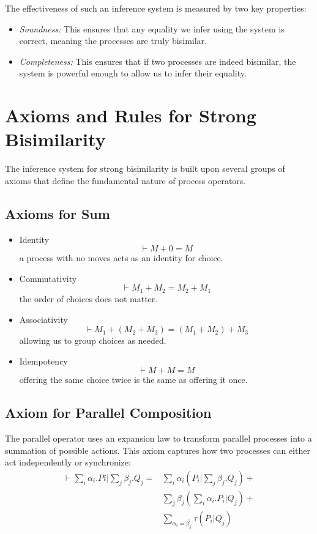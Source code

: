 The effectiveness of such an inference system is measured by two key properties:
\begin{itemize}
    \item \textit{Soundness:} This ensures that any equality we infer using the system is correct, meaning the processes are truly bisimilar.  
    \item \textit{Completeness:} This ensures that if two processes are indeed bisimilar, the system is powerful enough to allow us to infer their equality.
\end{itemize}

\section{Axioms and Rules for Strong Bisimilarity}
The inference system for strong bisimilarity is built upon several groups of axioms that define the fundamental nature of process operators.  

\subsection{Axioms for Sum}
\begin{itemize}
    \item Identity
    \begin{equation*}
        \vdash M+0=M
    \end{equation*}
    a process with no moves acts as an identity for choice.  
    \item Commutativity
    \begin{equation*}
        \vdash M_1+M_2=M_2+M_1
    \end{equation*}
    the order of choices does not matter.  
    \item Associativity
    \begin{equation*}
        \vdash M_1+(M_2+M_3)=(M_1+M_2)+M_3    
    \end{equation*}
    allowing us to group choices as needed.  
    \item Idempotency
    \begin{equation*}
        \vdash M+M=M
    \end{equation*}
    offering the same choice twice is the same as offering it once.
\end{itemize}

\subsection{Axiom for Parallel Composition}
The parallel operator uses an expansion law to transform parallel processes into a summation of possible actions. This axiom captures how two processes can either act independently or synchronize:
\begin{align*}
    \vdash \sum_{i}\alpha_i.Pi|\sum_{j}\beta_j.Q_j=&\sum_{i}\alpha_i(P_i|\sum_{j}\beta_j.Q_j)+\\
    &\sum_{j}\beta_j(\sum_{i}\alpha_i.P_i|Q_j)+\\
    &\sum_{\alpha_i=\overline{\beta_j}}\tau (P_i|Q_j)
\end{align*}


